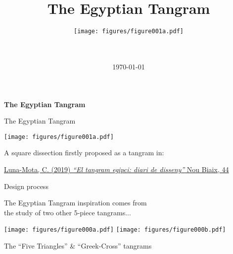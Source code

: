 \documentclass[14pt]{beamer}
\title{The Egyptian Tangram\vspace{-0.25em}}
\author{
    \texttt{[image: figures/figure001a.pdf]}\\
    \;\;{\small \textcopyright\ \href{https://github.com/CarlosLunaMota}{Carlos Luna-Mota}}\\
    \vspace{0.55em}
    \href{https://mmaca.cat/}{\large \framebox{\textbf{mmaca}}}\\
    \vspace{-1.85em}}
\date{\today}
\begin{document}

    \begin{frame}
      \titlepage
    \end{frame}


    \begin{frame}{}
        \begin{center}
            \textbf{\huge The Egyptian Tangram}
        \end{center}
    \end{frame}


    \begin{frame}{The Egyptian Tangram}
        \begin{center}
            \texttt{[image: figures/figure001a.pdf]} \\

            \bigskip

            A square dissection firstly proposed as a tangram in:

            \bigskip

            \href{https://publicacions.iec.cat/PopulaFitxa.do?idCatalogacio=33008}{\footnotesize Luna-Mota, C. (2019) \emph{``El tangram egipci: diari de disseny''} Nou Biaix, 44}
        \end{center}
    \end{frame}


    \begin{frame}{Design process}
        \begin{center}
            The Egyptian Tangram inspiration comes from\\the study of two other 5-piece tangrams...

            \bigskip

            \texttt{[image: figures/figure000a.pdf]} \qquad \texttt{[image: figures/figure000b.pdf]} \\

            \bigskip

            {\small The ``Five Triangles'' \& ``Greek-Cross'' tangrams}
        \end{center}
    \end{frame}
\end{document}
